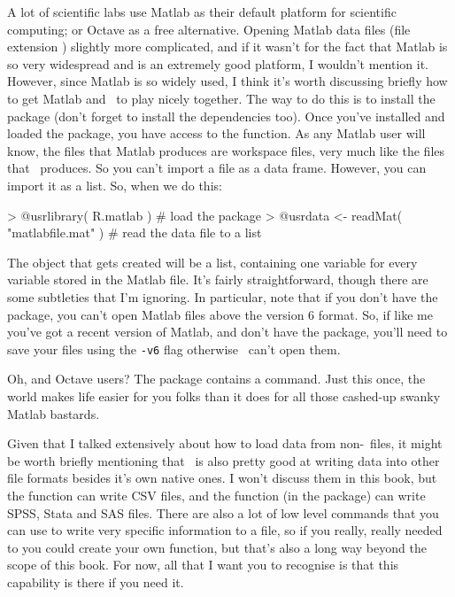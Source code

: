 
A lot of scientific labs use Matlab as their default platform for scientific computing; or Octave as a free alternative. Opening Matlab data files (file extension ) slightly more complicated, and if it wasn't for the fact that Matlab is so very widespread and is an extremely good platform, I wouldn't mention it. However, since Matlab is so widely used, I think it's worth discussing briefly how to get Matlab and \R\ to play nicely together. The way to do this is to install the  package (don't forget to install the dependencies too). Once you've installed and loaded the package, you have access to the  function. As any Matlab user will know, the  files that Matlab produces are workspace files, very much like the  files that \R\ produces. So you can't import a  file as a data frame. However, you can import it as a list. So, when we do this:
\begin{rblock1}
> @usr{library( R.matlab )}                   # load the package
> @usr{data <- readMat( "matlabfile.mat" )}   # read the data file to a list
\end{rblock1}
The  object that gets created will be a list, containing one variable for every variable stored in the Matlab file. It's fairly straightforward, though there are some subtleties that I'm ignoring. In particular, note that if you don't have the  package, you can't open Matlab files above the version 6 format. So, if like me you've got a recent version of Matlab, and don't have the  package, you'll need to save your files using the \verb#-v6# flag otherwise \R\ can't open them.


Oh, and Octave users? The  package contains a  command. Just this once, the world makes life easier for you folks than it does for all those cashed-up swanky Matlab bastards. 



Given that I talked extensively about how to load data from non-\R\ files, it might be worth briefly mentioning that \R\ is also pretty good at writing data into other file formats besides it's own native ones. I won't discuss them in this book, but the  function can write CSV files, and the  function (in the  package) can write SPSS, Stata and SAS files. There are also a lot of low level commands that you can use to write very specific information to a file, so if you really, really needed to you could create your own  function, but that's also a long way beyond the scope of this book. For now, all that I want you to recognise is that this capability is there if you need it. 



